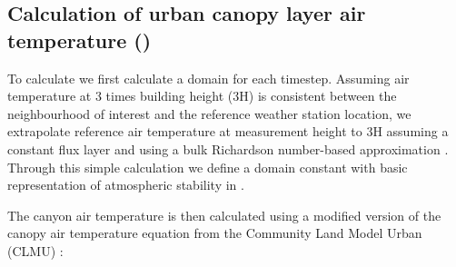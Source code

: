 \documentclass[final,3p,times,authoryear]{elsarticle}
\begin{document}





\subsection{Calculation of urban canopy layer air temperature () }\label{sec:calcTac}

To calculate  we first calculate a domain  for each timestep. Assuming air temperature at 3 times building height (3H) is consistent between the neighbourhood of interest and the reference weather station location, we extrapolate reference air temperature at measurement height to 3H assuming a constant flux layer and using a bulk Richardson number-based approximation \citep{Mascart1995}. Through this simple calculation we define a domain constant  with basic representation of atmospheric stability in .  

The canyon air temperature is then calculated using a modified version of the canopy air temperature equation from the Community Land Model Urban (CLMU) \citep{Oleson2010}:
\end{document}
